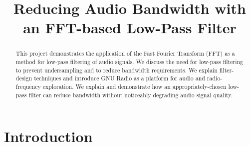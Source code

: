
\usepackage{graphicx} %
\usepackage{hyperref}
\usepackage{amsmath}
\usepackage{float} 
\usepackage{listings} %
 
\title{Reducing Audio Bandwidth with an FFT-based Low-Pass Filter}

\author{
    \and
    \and
}

\maketitle

\begin{abstract}

    This project demonstrates the application of the Fast Fourier
    Transform (FFT) as a method for low-pass filtering of audio
    signals. We discuss the need for low-pass filtering to
    prevent undersampling and to reduce bandwidth requirements.
    We explain filter-design techniques and introduce GNU Radio
    as a platform for audio and radio-frequency exploration.  We
    explain and demonstrate how an appropriately-chosen low-pass filter
    can reduce bandwidth without noticeably degrading audio signal quality.

\end{abstract}

\IEEEpeerreviewmaketitle

\section{Introduction} 

